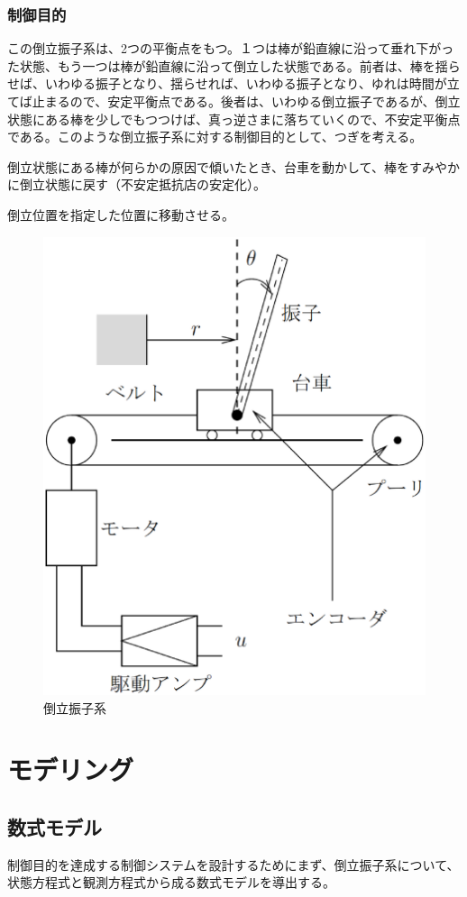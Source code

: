 \documentclass[a4j,11pt,twoside]{ujbook}
\begin{document}
\subsection{制御目的}
この倒立振子系は、2つの平衡点をもつ。１つは棒が鉛直線に沿って垂れ下がった状態、もう一つは棒が鉛直線に沿って倒立した状態である。前者は、棒を揺らせば、いわゆる振子となり、揺らせれば、いわゆる振子となり、ゆれは時間が立てば止まるので、安定平衡点である。後者は、いわゆる倒立振子であるが、倒立状態にある棒を少しでもつつけば、真っ逆さまに落ちていくので、不安定平衡点である。このような倒立振子系に対する制御目的として、つぎを考える。
\begin{description}
	\setlength{\itemindent}{0pt}
	\item[1゜]倒立状態にある棒が何らかの原因で傾いたとき、台車を動かして、棒をすみやかに倒立状態に戻す（不安定抵抗店の安定化）。
	\item[2゜]倒立位置を指定した位置に移動させる。
\end{description}
\begin{figure}[htbp]
	\begin{center}
		\includegraphics[width = 0.6 \linewidth]{model.eps}
		\caption{倒立振子系}
		\label{fig:倒立振子系}
	\end{center}
\end{figure}

\chapter{モデリング}
\section{数式モデル}
制御目的を達成する制御システムを設計するためにまず、倒立振子系について、状態方程式と観測方程式から成る数式モデルを導出する。
\end{document}
